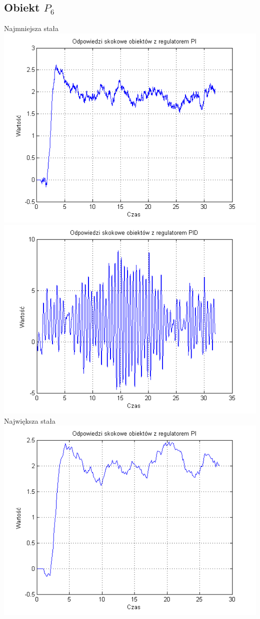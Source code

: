 \documentclass[10pt,a4paper]{article}
\begin{document}
\subsection*{Obiekt $P_6$}
Najmniejsza stała\\
\includegraphics[scale=1]{images/trzy/skrypt_11.png}\\
\includegraphics[scale=1]{images/cztery/skrypt_11.png}\\
Największa stała\\
\includegraphics[scale=1]{images/trzy/skrypt_12.png}\\
\end{document}
